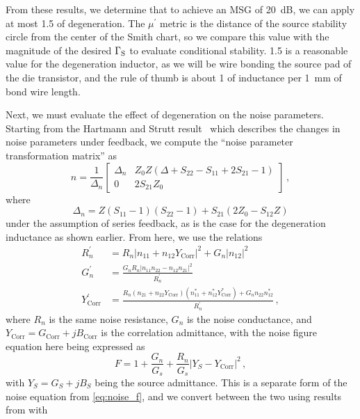 From these results, we determine that to achieve an MSG of \qty{20}{\dB}, we can apply at most \qty{1.5}{\nH} of degeneration.
The $\mu^\prime$ metric is the distance of the source stability circle from the center of the Smith chart, so we compare this value with the magnitude of the desired $\Gamma_{\text{S}}$ to evaluate conditional stability.
\qty{1.5}{\nH} is a reasonable value for the degeneration inductor, as we will be wire bonding the source pad of the die transistor, and the rule of thumb is about \qty{1}{\nH} of inductance per \qty{1}{\mm} of bond wire length.

Next, we must evaluate the effect of degeneration on the noise parameters.
Starting from the Hartmann and Strutt result~\cite{hartmannChangesFourNoise1973} which describes the changes in noise parameters under feedback, we compute the ``noise parameter transformation matrix'' as
%
\begin{equation}
    n = \frac{1}{\Delta_n}\begin{bmatrix}
        \Delta_n &  Z_0Z(\Delta + S_{22}-S_{11}+2S_{21}-1) \\
        0 & 2S_{21}Z_0
    \end{bmatrix}\,,
\end{equation}
%
where
%
\begin{equation*}
    \Delta_n = Z(S_{11}-1)(S_{22}-1) + S_{21}(2Z_0-S_{12}Z)
\end{equation*}
%
under the assumption of series feedback, as is the case for the degeneration inductance as shown earlier.
From here, we use the relations
%
\begin{align}
    R_n^\prime &= R_n|n_{11} + n_{12}Y_\text{Corr}|^2 + G_n|n_{12}|^2 \\
    G_n^\prime &= \frac{G_nR_n|n_{11}n_{22} - n_{12}n_{21}|^2}{R_n^\prime} \\
    Y_\text{Corr}^\prime &= \frac{R_n(n_{21} + n_{22}Y_\text{Corr})(n_{11}^*+n_{12}^*Y_\text{Corr}^*) + G_nn_{22}n_{12}^*}{R_n^\prime}\,,
\end{align}
%
where $R_n$ is the same noise resistance, $G_n$ is the noise conductance, and $Y_\text{Corr}=G_\text{Corr}+jB_\text{Corr}$ is the correlation admittance, with the noise figure equation here being expressed as
%
\begin{equation}
    F = 1 + \frac{G_n}{G_s} + \frac{R_n}{G_s}|Y_S - Y_\text{Corr}|^2\,,
\end{equation}
%
with $Y_S=G_S+jB_S$ being the source admittance.
This is a separate form of the noise equation from \autoref{eq:noise_f}, and we convert between the two using results from \cite{heymannNoiseLinearTwoPorts2022} with
